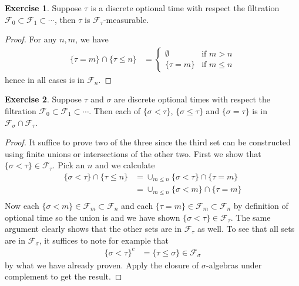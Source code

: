 \documentclass{amsbook}
\theoremstyle{definition}
\newtheorem{xca}{Exercise}
\theoremstyle{remark}
\begin{document}
\begin{xca}Suppose $\tau$ is a discrete optional
  time with respect the filtration $\mathcal{F}_0 \subset
  \mathcal{F}_1 \subset \cdots$, then $\tau$ is $\mathcal{F}_\tau$-measurable.
\end{xca}
\begin{proof}
For any $n, m$, we have 
\begin{align*}
\lbrace \tau = m \rbrace  \cap \lbrace \tau \leq n \rbrace &=
\begin{cases}
\emptyset & \text{if $m > n$} \\
\lbrace \tau = m \rbrace & \text{if $m\leq n$}
\end{cases}
\end{align*}
hence in all cases is in $\mathcal{F}_n$.
\end{proof}

\begin{xca}Suppose $\tau$ and $\sigma$ are discrete optional
  times with respect the filtration $\mathcal{F}_0 \subset
  \mathcal{F}_1 \subset \cdots$. Then each of $\lbrace \sigma < \tau
  \rbrace$, $\lbrace \sigma \leq \tau
  \rbrace$ and $\lbrace \sigma = \tau
  \rbrace$ is in $\mathcal{F}_{\sigma} \cap \mathcal{F}_{\tau}$.
\end{xca}
\begin{proof}
It suffice to prove two of the three since the third set can be
constructed using finite unions or intersections of the other two.
First we show that $\lbrace \sigma < \tau \rbrace \in
\mathcal{F}_\tau$.
Pick an $n$ and we calculate
\begin{align*}
\lbrace \sigma < \tau \rbrace \cap \lbrace \tau \leq n \rbrace &=
\cup_{m\leq n}\lbrace \sigma < \tau \rbrace \cap \lbrace \tau = m
\rbrace \\
&= \cup_{m\leq n}\lbrace \sigma < m \rbrace \cap \lbrace \tau = m
\rbrace \\
\end{align*}
Now each $\lbrace \sigma < m \rbrace \in \mathcal{F}_m \subset
\mathcal{F}_n$ and each $\lbrace \tau = m
\rbrace \in \mathcal{F}_m \subset
\mathcal{F}_n$ by definition of optional time so the union is and we
have shown $\lbrace \sigma < \tau \rbrace \in \mathcal{F}_\tau$.  The
same argument clearly shows that the other sets are in
$\mathcal{F}_\tau$ as well.  To see that all sets are in
$\mathcal{F}_\sigma$, it suffices to note for example that 
\begin{align*}
\lbrace \sigma < \tau \rbrace^c &= \lbrace \tau \leq \sigma \rbrace
\in \mathcal{F}_\sigma
\end{align*}
by what we have already proven. Apply the closure of $\sigma$-algebras
under complement to get the result.
\end{proof}
\end{document}

